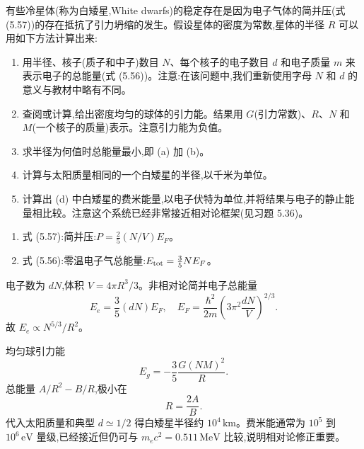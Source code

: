 \begin{question}
有些冷星体(称为白矮星,White dwarfs)的稳定存在是因为电子气体的简并压(式 (5.57))的存在抵抗了引力坍缩的发生。假设星体的密度为常数,星体的半径 $R$ 可以用如下方法计算出来:
\begin{enumerate}
\item 用半径、核子(质子和中子)数目 $N$、每个核子的电子数目 $d$ 和电子质量 $m$ 来表示电子的总能量(式 (5.56))。注意:在该问题中,我们重新使用字母 $N$ 和 $d$ 的意义与教材中略有不同。
\item 查阅或计算,给出密度均匀的球体的引力能。结果用 $G$(引力常数)、$R$、$N$ 和 $M$(一个核子的质量)表示。注意引力能为负值。
\item 求半径为何值时总能量最小,即 (a) 加 (b)。
\item 计算与太阳质量相同的一个白矮星的半径,以千米为单位。
\item 计算出 (d) 中白矮星的费米能量,以电子伏特为单位,并将结果与电子的静止能量相比较。注意这个系统已经非常接近相对论框架(见习题 5.36)。
\end{enumerate}

\par\smallskip
{}
\begin{enumerate}[leftmargin=2.2em,itemsep=0.12em,topsep=0.12em,parsep=0pt]
\item 式 (5.57):简并压:$P=\frac25(N/V)E_F$。
\item 式 (5.56):零温电子气总能量:$E_{\rm tot}=\frac35NE_F$。
\end{enumerate}

\begin{solution}

电子数为 $dN$,体积 $V=4\pi R^3/3$。非相对论简并电子总能量
\[
E_e=\frac35(dN)E_F,
\quad
E_F=\frac{\hbar^2}{2m}\left(3\pi^2\frac{dN}{V}\right)^{2/3}.
\]
故 $E_e\propto N^{5/3}/R^2$。

均匀球引力能
\[
E_g=-\frac35\frac{G(NM)^2}{R}.
\]
总能量 $A/R^2-B/R$,极小在
\[
R=\frac{2A}{B}.
\]
代入太阳质量和典型 $d\simeq1/2$ 得白矮星半径约 $10^4\,\mathrm{km}$。费米能通常为 $10^5$ 到 $10^6\,\mathrm{eV}$ 量级,已经接近但仍可与 $m_ec^2=0.511\,\mathrm{MeV}$ 比较,说明相对论修正重要。

\end{solution}
\end{question}

